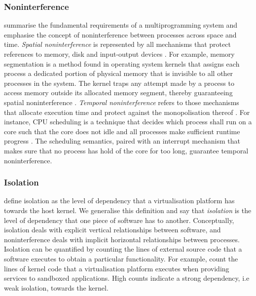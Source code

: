 \subsubsection{Noninterference}
\label{sections:fundamentals/virtualisation/axioms/noninterference}
\textcite{10.1145/368481.368502} summarise the fundamental requirements of a multiprogramming 
system and emphasise the concept of noninterference between processes across space and time. 
\textit{Spatial noninterference} is represented by all mechanisms that protect references to memory, 
disk and input-output devices \cite{10.1145/368481.368502}. For example, memory segmentation 
is a method found in operating system kernels that assigns each process a dedicated portion
of physical memory that is invisible to all other processes in the system. The kernel traps 
any attempt made by a process to access memory outside its allocated memory segment, thereby 
guaranteeing spatial noninterference \cite{10.5555/2490781}. \textit{Temporal noninterference} refers
to those mechanisms that allocate execution time and protect against the monopolisation thereof 
\cite{10.1145/368481.368502}. For instance, CPU scheduling is a technique that decides which process 
shall run on a core such that the core does not idle and all processes make sufficient 
runtime progress \cite{10.5555/2490781}. The scheduling semantics, paired with an interrupt mechanism 
that makes sure that no process has hold of the core for too long, guarantee temporal noninterference.

\subsubsection{Isolation}
\label{sections:fundamentals/virtualisation/axioms/isolation}
\textcite{10.1145/3381052.3381315} define isolation as the level of dependency that a virtualisation 
platform has towards the host kernel. We generalise this definition and say that \textit{isolation} 
is the level of dependency that one piece of software has to another. Conceptually, isolation 
deals with explicit vertical relationships between software, and noninterference deals with 
implicit horizontal relationships between processes. Isolation can be quantified by counting the 
lines of external source code that a software executes to obtain a particular functionality. 
For example, \textcite{10.1145/3381052.3381315} count the lines of kernel code 
that a virtualisation platform executes when providing services to sandboxed applications. 
High counts indicate a strong dependency, i.e weak isolation, towards the kernel. 

